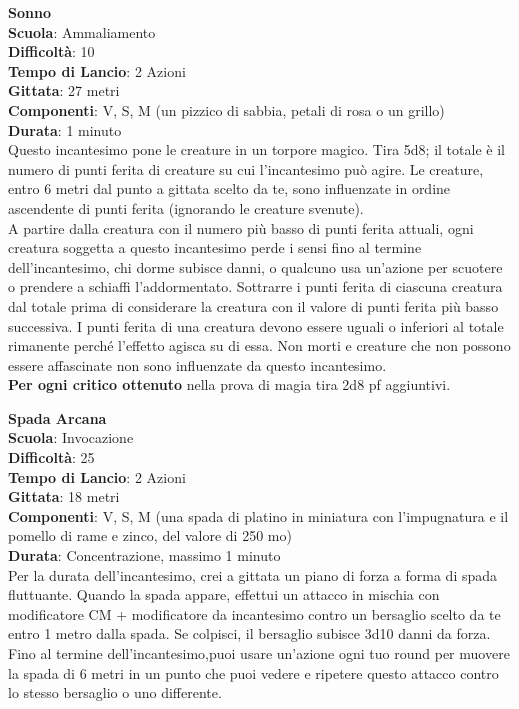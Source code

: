 \begin{multicols}{2}
\medskip\textbf{Sonno}\\
\textbf{Scuola}: Ammaliamento\\
\textbf{Difficoltà}: 10\\
\textbf{Tempo di Lancio}: 2 Azioni\\
\textbf{Gittata}: 27 metri\\
\textbf{Componenti}: V, S, M (un pizzico di sabbia, petali di rosa o un grillo)\\
\textbf{Durata}: 1 minuto\\
Questo incantesimo pone le creature in un torpore magico. Tira 5d8; il totale è il numero di punti ferita di creature su cui l'incantesimo può agire. Le creature, entro 6 metri dal punto a gittata scelto da te, sono influenzate in ordine ascendente di punti ferita (ignorando le creature svenute).\\
A partire dalla creatura con il numero più basso di punti ferita attuali, ogni creatura soggetta a questo incantesimo perde i sensi fino al termine dell'incantesimo, chi dorme subisce danni, o qualcuno usa un'azione per scuotere o prendere a schiaffi l'addormentato. Sottrarre i punti ferita di ciascuna creatura dal totale prima di considerare la creatura con il valore di punti ferita più basso successiva. I punti ferita di una creatura devono essere uguali o inferiori al totale rimanente perché l'effetto agisca su di essa. Non morti e creature che non possono essere affascinate non sono influenzate da questo incantesimo.\\
\textbf{Per ogni critico ottenuto} nella prova di magia tira 2d8 pf aggiuntivi.

\medskip\textbf{Spada Arcana}\\
\textbf{Scuola}: Invocazione\\
\textbf{Difficoltà}: 25\\
\textbf{Tempo di Lancio}: 2 Azioni\\
\textbf{Gittata}: 18 metri\\
\textbf{Componenti}: V, S, M (una spada di platino in miniatura con l'impugnatura e il pomello di rame e zinco, del valore di 250 mo)\\
\textbf{Durata}: Concentrazione, massimo 1 minuto \\
Per la durata dell'incantesimo, crei a gittata un piano di forza a forma di spada fluttuante. Quando la spada appare, effettui un attacco in mischia con modificatore CM + modificatore da incantesimo contro un bersaglio scelto da te entro 1 metro dalla spada. Se colpisci, il bersaglio subisce 3d10 danni da forza. Fino al termine dell'incantesimo,puoi usare un'azione ogni tuo round per muovere la spada di 6 metri in un punto che puoi vedere e ripetere questo attacco contro lo stesso bersaglio o uno differente.


\end{multicols}
